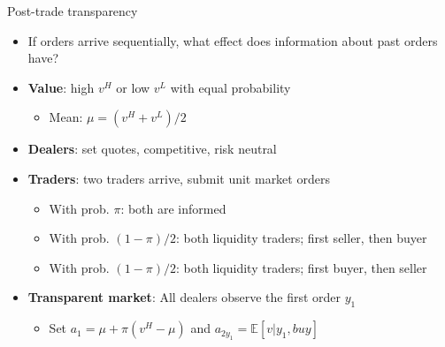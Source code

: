 \documentclass[english,10pt
,aspectratio=169
]{beamer}
\begin{document}
\begin{frame}{Post-trade transparency}
	\begin{itemize}
		\item If orders arrive sequentially, what effect does information about past orders have?
		\item \textbf{Value}: high $v^H$ or low $v^L$ with equal probability
		\begin{itemize}
			\item Mean: $\mu=(v^H+v^L)/2$
		\end{itemize}
		\item \textbf{Dealers}: set quotes, competitive, risk neutral
		\item \textbf{Traders}: two traders arrive, submit unit market orders
		\begin{itemize}
			\item With prob. $\pi$: both are informed
			\item With prob. $(1-\pi)/2$: both liquidity traders;  first  seller, then buyer
			\item With prob. $(1-\pi)/2$: both liquidity traders;  first  buyer, then seller
		\end{itemize}
		\item \textbf{Transparent market}: All dealers observe the first order $y_1$
		\begin{itemize}
			\item Set $a_1=\mu+\pi(v^{H}-\mu)$ and $a_{2y_1}=\mathbb{E}[v|y_1,buy]$
		\end{itemize}
	\end{itemize}
\end{frame}
\end{document}
